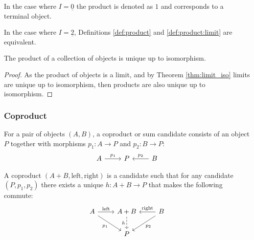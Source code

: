 \begin{remark}
	In the case where $I=\underline{0}$ the product is denoted as $1$ and
	corresponds to a terminal object.
\end{remark}

\begin{remark}
	In the case where $I=\underline{2}$, Definitions \ref{def:product} and
	\ref{def:product:limit} are equivalent.
\end{remark}

\begin{theorem}
	The product of a collection of objects is unique up to isomorphism.

	\begin{proof}
		As the product of objects is a limit, and by Theorem \ref{thm:limit_iso}
		limits are unique up to isomorphism, then products are also unique up to
		isomorphism.
	\end{proof}
\end{theorem}

\subsubsection*{Coproduct}

\begin{definition}

	For a pair of objects $(A, B)$, a coproduct or sum candidate consists of an
	object $P$ together with morphisms $p_1: A\to P$ and
	$p_2:B\to P$:
	\[\begin{tikzcd}[ampersand replacement=\&]
		A \& P \& B
		\arrow["{p_1}", from=1-1, to=1-2]
		\arrow["{p_2}"', from=1-3, to=1-2]
	\end{tikzcd}\]

	A coproduct $(A+ B, \mathrm{left}, \mathrm{right})$ is a candidate such that
	for any candidate $(P, p_1, p_2)$ there exists a unique $h: A+B\to P$ that
	makes the following commute:
	\parencite{leinster:basic_category_theory}
	\[\begin{tikzcd}[ampersand replacement=\&]
		A \& {A+ B} \& B \\
		\& P
		\arrow["{\mathrm{left}}", from=1-1, to=1-2]
		\arrow["{\mathrm{right}}"', from=1-3, to=1-2]
		\arrow["{p_1}"', from=1-1, to=2-2]
		\arrow["{p_2}", from=1-3, to=2-2]
		\arrow["h"', dashed, from=1-2, to=2-2]
	\end{tikzcd}\]
\end{definition}


